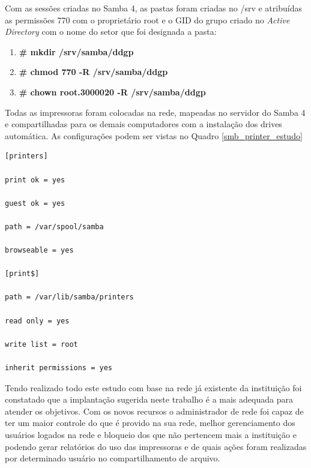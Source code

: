 Com as sessões criadas no Samba 4, as pastas foram criadas no /srv e atribuídas as permissões 770 com o proprietário root e o GID do grupo criado no \textit{Active Directory} com o nome do setor que foi designada a pasta:

\begin{enumerate}
	\item \textbf{\# mkdir /srv/samba/ddgp}
	\item \textbf{\# chmod 770 -R /srv/samba/ddgp}
	\item \textbf{\# chown root.3000020 -R /srv/samba/ddgp}
\end{enumerate}

Todas as impressoras foram colocadas na rede, mapeadas no servidor do Samba 4 e compartilhadas para os demais computadores com a instalação dos drives automática. As configurações podem ser vistas no Quadro \ref{smb_printer_estudo}\\

\begin{lstlisting}[caption=Arquivo /etc/smb.conf com as variáveis aplicadas no estudo de caso para compartilhar impressoras.,label={smb_printer_estudo}]
[printers] 

print ok = yes 

guest ok = yes

path = /var/spool/samba 

browseable = yes

[print$] 

path = /var/lib/samba/printers 

read only = yes

write list = root 

inherit permissions = yes
\end{lstlisting}

Tendo realizado todo este estudo com base na rede já existente da instituição  foi constatado que a implantação sugerida neste trabalho é a mais adequada para atender os objetivos. Com os novos recursos o administrador de rede foi capaz de ter um maior controle do que é provido na sua rede, melhor gerenciamento dos usuários logados na rede e bloqueio dos que não pertencem mais a instituição e podendo gerar relatórios do uso das impressoras e de quais ações foram realizadas por determinado usuário no compartilhamento de arquivo.

